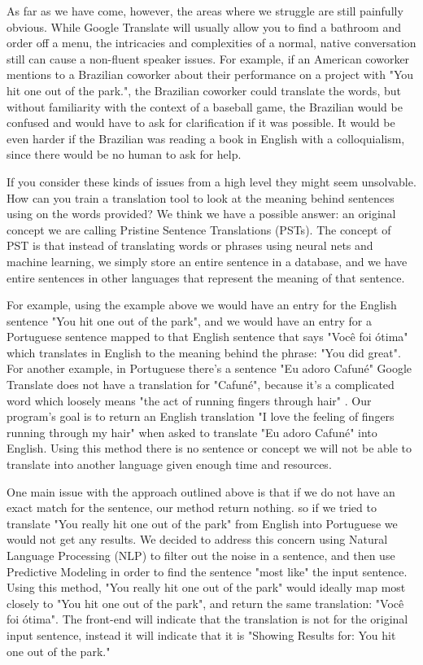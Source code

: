 \documentclass{llncs}
\begin{document}
	As far as we have come, however, the areas where we struggle are still painfully obvious. While Google Translate will usually allow you to find a bathroom and order off a menu, the intricacies and complexities of a normal, native conversation still can cause a non-fluent speaker issues. For example, if an American coworker mentions to a Brazilian coworker about their performance on a project with "You hit one out of the park.", the Brazilian coworker could translate the words, but without familiarity with the context of a baseball game, the Brazilian would be confused and would have to ask for clarification if it was possible. It would be even harder if the Brazilian was reading a book in English with a colloquialism, since there would be no human to ask for help.
	
	If you consider these kinds of issues from a high level they might seem unsolvable. How can you train a translation tool to look at the meaning behind sentences using on the words provided? We think we have a possible answer: an original concept we are calling Pristine Sentence Translations (PSTs). The concept of PST is that instead of translating words or phrases using neural nets and machine learning, we simply store an entire sentence in a database, and we have entire sentences in other languages that represent the meaning of that sentence. 
	
	For example, using the example above we would have an entry for the English sentence "You hit one out of the park", and we would have an entry for a Portuguese sentence mapped to that English sentence that says "Você foi ótima" which translates in English to the meaning behind the phrase: "You did great". For another example, in Portuguese there's a sentence "Eu adoro Cafuné" Google Translate does not have a translation for "Cafuné", because it's a complicated word which loosely means "the act of running fingers through hair" . Our program's goal is to return an English translation "I love the feeling of fingers running through my hair" when asked to translate "Eu adoro Cafuné" into English. Using this method there is no sentence or concept we will not be able to translate into another language given enough time and resources.
	
	One main issue with the approach outlined above is that if we do not have an exact match for the sentence, our method return nothing. so if we tried to translate "You really hit one out of the park" from English into Portuguese we would not get any results. We decided to address this concern using Natural Language Processing (NLP) to filter out the noise in a sentence, and then use Predictive Modeling in order to find the sentence "most like" the input sentence. Using this method, "You really hit one out of the park" would ideally map most closely to "You hit one out of the park", and return the same translation: "Você foi ótima". The front-end will indicate that the translation is not for the original input sentence, instead it will indicate that it is "Showing Results for: You hit one out of the park."
	
\end{document}
